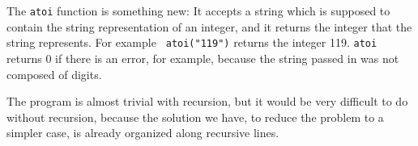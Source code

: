 \begin{flushleft}
\verb%void hanoi(int num_rings, int start_peg, int end_peg);%
\\* \verb%void move(int ring_num, int start, int end);%
\end{flushleft}

\begin{flushleft}
\verb%int main(int argc, char **argv)%
\\* \verb%{%
\\* \verb%  int num_rings;%

\verb%  if (argc != 2) {%
\\* \verb%    fprintf(stderr, "Usage: %\verb-%-\verb%s number_of_rings\n", argv[0]);%
\\* \verb%    return 1;%
\\* \verb%  }%

\verb%  num_rings = atoi(argv[1]);%

\verb%  hanoi(num_rings, 1, 3);%

\verb%  return 0;%
\\* \verb%}%
\end{flushleft}

    The {\tt atoi} function is something new: It accepts a string which
is supposed to contain the string representation of an integer, and it
returns the integer that the string represents.  For example {\tt
atoi("119")} returns the integer 119.  {\tt atoi} returns 0 if there is
an error, for example, because the string passed in was not composed of
digits.

The program is almost trivial with recursion, but it would be very
difficult to do without recursion, because the solution we have, to
reduce the problem to a simpler case, is already organized along
recursive lines.


